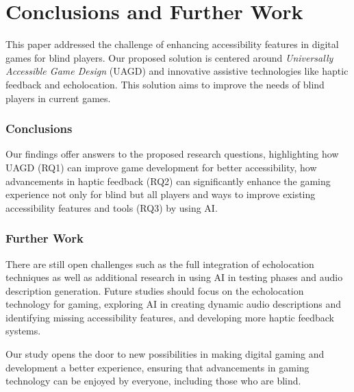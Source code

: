 \documentclass[sigconf,natbib=false,10pt]{acmart}
\begin{document}
	\section{Conclusions and Further Work}
	This paper addressed the challenge of enhancing accessibility features in digital games for blind players.
	Our proposed solution is centered around \emph{Universally Accessible Game Design} (UAGD) and innovative assistive technologies like haptic feedback and echolocation.
	This solution aims to improve the needs of blind players in current games.
	
	\subsubsection{Conclusions}
	Our findings offer answers to the proposed research questions, highlighting how UAGD (RQ1) can improve game development for better accessibility, how advancements in haptic feedback (RQ2) can significantly enhance the gaming experience not only for blind but all players and ways to improve existing accessibility features and tools (RQ3) by using AI.
	
	\subsubsection{Further Work}
	There are still open challenges such as the full integration of echolocation techniques as well as additional research in using AI in testing phases and audio description generation.
	Future studies should focus on the echolocation technology for gaming, exploring AI in creating dynamic audio descriptions and identifying missing accessibility features, and developing more haptic feedback systems.
	
	Our study opens the door to new possibilities in making digital gaming and development a better experience, ensuring that advancements in gaming technology can be enjoyed by everyone, including those who are blind.
	
	\printbibliography
	
\end{document}
